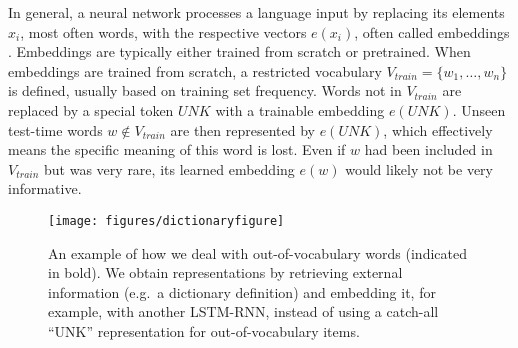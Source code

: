 In general, a neural network processes a language input by replacing its elements $x_i$, most often words, with the respective vectors $e(x_i)$, often called embeddings \citep{bengio2003neural}. Embeddings are typically either trained from scratch or pretrained. When embeddings are trained from scratch, a restricted vocabulary $V_{train}=\{w_1,\ldots,w_{n}\}$ is defined, usually based on training set frequency.
Words not in $V_{train}$ are replaced by a special token $\mathit{UNK}$ with a trainable embedding $e(\mathit{UNK})$. Unseen test-time words $w \notin V_{train}$ are then represented by $e(\mathit{UNK})$, which effectively means the specific meaning of this word is lost. Even if $w$ had been included in $V_{train}$ but was very rare, its learned embedding $e(w)$ would likely not be very informative.
\begin{figure}
% 
% 
% 
\centering
\texttt{[image: figures/dictionaryfigure]}
\caption{\label{fig:dictionaryembed}An example of how we deal with out-of-vocabulary words (indicated in bold). We obtain representations by retrieving external information (e.g.~a dictionary definition) and embedding it, for example, with another LSTM-RNN, instead of using a catch-all ``UNK'' representation for out-of-vocabulary items.}
\end{figure}

